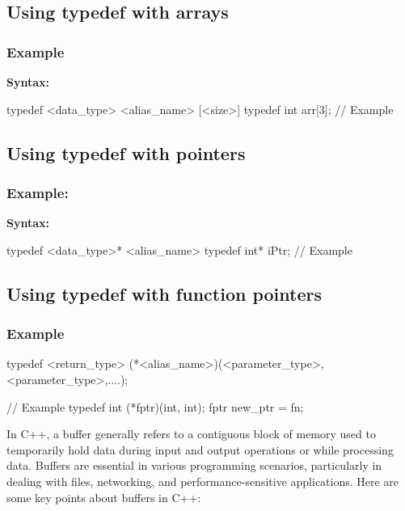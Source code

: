 \documentclass{report}
\begin{document}
\begin{concept}
    \subsection{Using typedef with arrays}
    \bigbreak \noindent 
    \subsubsection{Example}
    \bigbreak \noindent 
    \textbf{Syntax:}
    \bigbreak \noindent 
    \begin{cppcode}
    typedef <data_type> <alias_name> [<size>]
    typedef int arr[3];  // Example
    \end{cppcode}

    \pagebreak 
    \subsection{Using typedef with pointers}
    \bigbreak \noindent 
    \subsubsection{Example:}
    \bigbreak \noindent 
    \textbf{Syntax:}
    \bigbreak \noindent 
    \begin{cppcode}
    typedef <data_type>* <alias_name>
    typedef int* iPtr; // Example
    \end{cppcode}

    \bigbreak \noindent 
    \subsection{Using typedef with function pointers}
    \bigbreak \noindent 
    \subsubsection{Example}
    \bigbreak \noindent 
    \begin{cppcode}
    typedef <return_type> (*<alias_name>)(<parameter_type>,<parameter_type>,....);

    // Example
    typedef int (*fptr)(int, int);
    fptr new_ptr = fn; 
    \end{cppcode}

    \pagebreak 
    \bigbreak \noindent 
    \begin{concept}
         In C++, a buffer generally refers to a contiguous block of memory used to temporarily hold data during input and output operations or while processing data. Buffers are essential in various programming scenarios, particularly in dealing with files, networking, and performance-sensitive applications. Here are some key points about buffers in C++:
    \end{concept}
    \bigbreak \noindent 

\end{concept}
\end{document}
